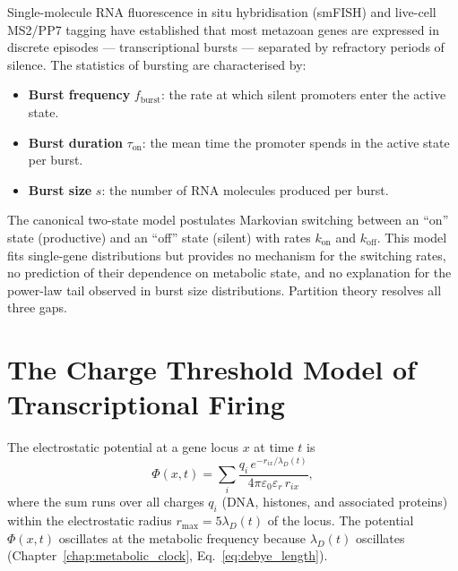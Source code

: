 Single-molecule RNA fluorescence in situ hybridisation (smFISH) and live-cell
MS2/PP7 tagging have established that most metazoan genes are expressed in
discrete episodes --- transcriptional bursts --- separated by refractory
periods of silence. The statistics of bursting are characterised by:
\begin{itemize}
  \item \textbf{Burst frequency} $f_{\mathrm{burst}}$: the rate at which
        silent promoters enter the active state.
  \item \textbf{Burst duration} $\tau_{\mathrm{on}}$: the mean time the
        promoter spends in the active state per burst.
  \item \textbf{Burst size} $s$: the number of RNA molecules produced per
        burst.
\end{itemize}

The canonical two-state model postulates Markovian switching between an
``on'' state (productive) and an ``off'' state (silent) with rates
$k_{\mathrm{on}}$ and $k_{\mathrm{off}}$. This model fits single-gene
distributions but provides no mechanism for the switching rates, no prediction
of their dependence on metabolic state, and no explanation for the power-law
tail observed in burst size distributions. Partition theory resolves all three
gaps.

\section{The Charge Threshold Model of Transcriptional Firing}
\label{sec:charge_threshold}

\begin{definition}
\label{def:promoter_potential}
The electrostatic potential at a gene locus $x$ at time $t$ is
\begin{equation}
  \Phi(x,t) = \sum_{i} \frac{q_i\,e^{-r_{ix}/\lambda_D(t)}}{4\pi\varepsilon_0\varepsilon_r\,r_{ix}},
  \label{eq:promoter_potential}
\end{equation}
where the sum runs over all charges $q_i$ (DNA, histones, and associated
proteins) within the electrostatic radius $r_{\mathrm{max}} = 5\lambda_D(t)$
of the locus. The potential $\Phi(x,t)$ oscillates at the metabolic frequency
because $\lambda_D(t)$ oscillates (Chapter~\ref{chap:metabolic_clock},
Eq.~\eqref{eq:debye_length}).
\end{definition}

